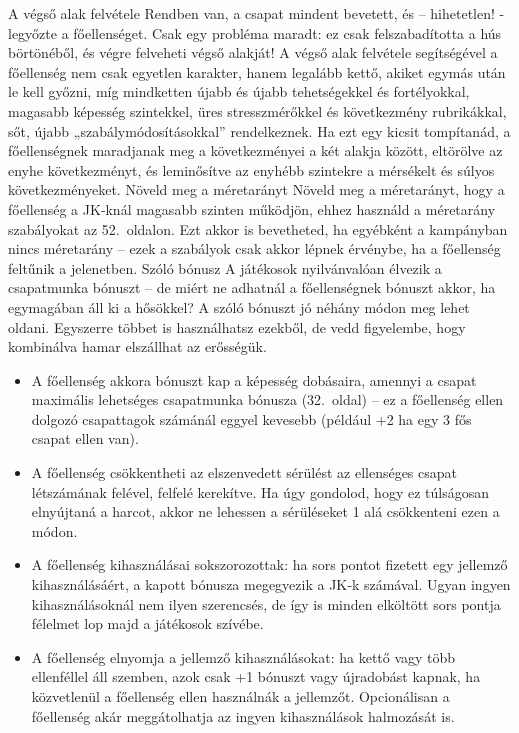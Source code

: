 \documentclass[oneside]{book}
\newcommand{\page}[1]{#1.~oldal}
\newcommand{\onpage}[1]{#1.~oldalon}
\begin{document}
A végső alak felvétele
Rendben van, a csapat mindent bevetett, és – hihetetlen! - legyőzte a főellenséget. Csak egy probléma maradt: ez csak felszabadította a hús börtönéből, és végre felveheti végső alakját!
A végső alak felvétele segítségével a főellenség nem csak egyetlen karakter, hanem legalább kettő, akiket egymás után le kell győzni, míg mindketten újabb és újabb tehetségekkel és fortélyokkal, magasabb képesség szintekkel, üres stresszmérőkkel és következmény rubrikákkal, sőt, újabb „szabálymódosításokkal” rendelkeznek.
Ha ezt egy kicsit tompítanád, a főellenségnek maradjanak meg a következményei a két alakja között, eltörölve az enyhe következményt, és leminősítve az enyhébb szintekre a mérsékelt és súlyos következményeket.
Növeld meg a méretarányt
Növeld meg a méretarányt, hogy a főellenség a JK‑knál magasabb szinten működjön, ehhez használd a méretarány szabályokat az \onpage{52}. Ezt akkor is bevetheted, ha egyébként a kampányban nincs méretarány – ezek a szabályok csak akkor lépnek érvénybe, ha a főellenség feltűnik a jelenetben.
Szóló bónusz
A játékosok nyilvánvalóan élvezik a csapatmunka bónuszt – de miért ne adhatnál a főellenségnek bónuszt akkor, ha egymagában áll ki a hősökkel?
A szóló bónuszt jó néhány módon meg lehet oldani. Egyszerre többet is használhatsz ezekből, de vedd figyelembe, hogy kombinálva hamar elszállhat az erősségük.

\begin{itemize}
    \item A főellenség akkora bónuszt kap a képesség dobásaira, amennyi a csapat maximális lehetséges csapatmunka bónusza (\page{32}) – ez a főellenség ellen dolgozó csapattagok számánál eggyel kevesebb (például +2 ha egy 3 fős csapat ellen van).
    \item A főellenség csökkentheti az elszenvedett sérülést az ellenséges csapat létszámának felével, felfelé kerekítve. Ha úgy gondolod, hogy ez túlságosan elnyújtaná a harcot, akkor ne lehessen a sérüléseket 1 alá csökkenteni ezen a módon.
    \item A főellenség kihasználásai sokszorozottak: ha sors pontot fizetett egy jellemző kihasználásáért, a kapott bónusza megegyezik a JK‑k számával. Ugyan ingyen kihasználásoknál nem ilyen szerencsés, de így is minden elköltött sors pontja félelmet lop majd a játékosok szívébe.
    \item A főellenség elnyomja a jellemző kihasználásokat: ha kettő vagy több ellenféllel áll szemben, azok csak +1 bónuszt vagy újradobást kapnak, ha közvetlenül a főellenség ellen használnák a jellemzőt. Opcionálisan a főellenség akár meggátolhatja az ingyen kihasználások halmozását is.
\end{itemize}
\end{document}
